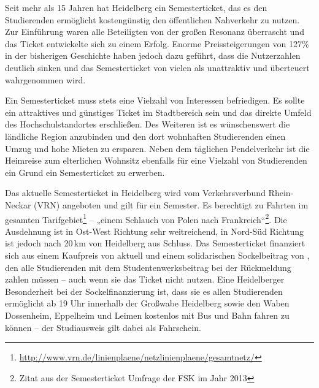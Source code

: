 % 
% 

Seit mehr als 15 Jahren hat Heidelberg ein Semesterticket, das es den
Studierenden ermöglicht kostengünstig den öffentlichen Nahverkehr zu nutzen.
Zur Einführung waren alle Beteiligten von der großen Resonanz überrascht und
das Ticket entwickelte sich zu einem Erfolg. Enorme Preissteigerungen von
127\% in der bisherigen Geschichte haben jedoch dazu geführt, dass die
Nutzerzahlen deutlich sinken und das Semesterticket von vielen als unattraktiv
und überteuert wahrgenommen wird.

Ein Semesterticket muss stets eine Vielzahl von Interessen befriedigen. Es
sollte ein attraktives und günstiges Ticket im Stadtbereich sein und das
direkte Umfeld des Hochschulstandortes erschließen. Des Weiteren ist es
wünschenswert die ländliche Region anzubinden und den dort wohnhaften
Studierenden einen Umzug und hohe Mieten zu ersparen. Neben dem täglichen
Pendelverkehr ist die Heimreise zum elterlichen Wohnsitz ebenfalls für eine
Vielzahl von Studierenden ein Grund ein Semesterticket zu erwerben.

Das aktuelle Semesterticket in Heidelberg wird vom Verkehrsverbund Rhein-Neckar
(VRN) angeboten und gilt für ein Semester. Es berechtigt zu Fahrten im gesamten
Tarifgebiet\footnote{\url{http://www.vrn.de/linienplaene/netzlinienplaene/gesamtnetz/}}
-- „einem Schlauch von Polen nach Frankreich“\footnote{Zitat aus der
Semesterticket Umfrage der FSK im Jahr 2013}. Die Ausdehnung ist in Ost-West
Richtung sehr weitreichend, in Nord-Süd Richtung ist jedoch nach 20\,km von
Heidelberg aus Schluss. Das Semesterticket finanziert sich aus einem Kaufpreis
von aktuell \EUR{\semesterticket} und einem solidarischen Sockelbeitrag von
\EUR{\sockelbeitrag}, den alle Studierenden mit dem Studentenwerksbeitrag bei
der Rückmeldung zahlen müssen -- auch wenn sie das Ticket nicht nutzen. Eine
Heidelberger Besonderheit bei der Sockelfinanzierung ist, dass sie es allen
Studierenden ermöglicht ab 19 Uhr innerhalb der Großwabe Heidelberg sowie den
Waben Dossenheim, Eppelheim und Leimen kostenlos mit Bus und Bahn fahren zu
können -- der Studiausweis gilt dabei als Fahrschein.

